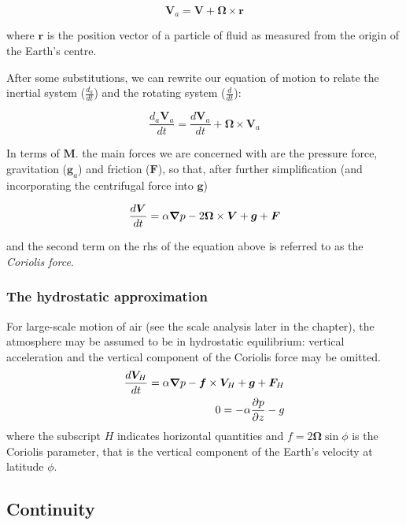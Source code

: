 \begin{equation}
	\bm{V}_a=\bm{V} + \bm{\Omega} \times \bm{r}
\end{equation}

where $\bm{r}$ is the position vector of a particle of fluid as measured from the origin of the Earth's centre.

After some substitutions, we can rewrite our equation of motion to relate the inertial system ($\frac{d_a}{dt}$) and the rotating system ($\frac{d}{dt}$):

\begin{equation}
	\frac{d_a \bm{V}_a}{dt}=   \frac{d \bm{V}_a}{dt}    + \bm{\Omega} \times \bm{V}_a
\end{equation}

In terms of $\bm{M}$. the main forces we are concerned with are the pressure force, gravitation  ($\bm{g}_a$) and friction ($\bm{F}$), so that, after further simplification (and incorporating the centrifugal force into $\bm{g}$)

\begin{equation}
	\frac{d \bm{V}}{dt} = \alpha \mbox{\boldmath $\nabla$}{p} -2 \bm{\Omega} \times \bm{V} + \bm{g} + \bm{F}
\end{equation}

and the second term on the rhs of the equation above is referred to as the \emph{Coriolis force}.

\subsubsection{The hydrostatic approximation}

For large-scale motion of air (see the scale analysis later in the chapter), the atmosphere may be assumed to be in hydrostatic equilibrium: vertical acceleration and the vertical component of the Coriolis force may be omitted.
\begin{eqnarray}
	\frac{d \bm{V}_H}{dt} = \alpha \mbox{\boldmath $\nabla$}{p} - \bm{f} \times \bm{V}_H + \bm{g} + \bm{F}_H \nonumber \\
	0 = -\alpha \frac{\partial p}{\partial z} - g
\end{eqnarray}
where the subscript $H$ indicates horizontal quantities and $f=2\bm{\Omega}\sin{\phi}$ is the Coriolis parameter, that is the vertical component of the Earth's velocity at latitude $\phi$.

\subsection{Continuity}

